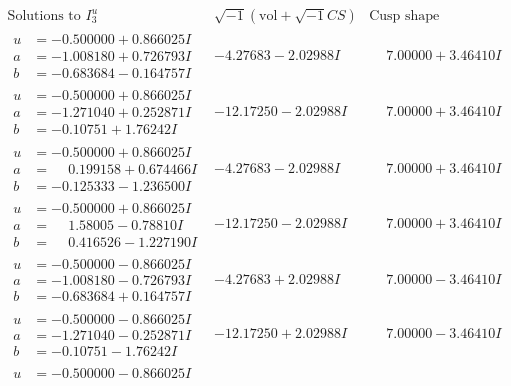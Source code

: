 \documentclass[1p]{elsarticle_modified}
\theoremstyle{definition}
\newcommand{\I}{\sqrt{-1}}
\begin{document}
$$\begin{array}{c|c|c}  
\text{Solutions to }I^u_{3}& \I (\text{vol} + \sqrt{-1}CS) & \text{Cusp shape}\\
 \hline 
\begin{aligned}
u &= -0.500000 + 0.866025 I \\
a &= -1.008180 + 0.726793 I \\
b &= -0.683684 - 0.164757 I\end{aligned}
 & -4.27683 - 2.02988 I & \phantom{-}7.00000 + 3.46410 I \\ \hline\begin{aligned}
u &= -0.500000 + 0.866025 I \\
a &= -1.271040 + 0.252871 I \\
b &= -0.10751 + 1.76242 I\end{aligned}
 & -12.17250 - 2.02988 I & \phantom{-}7.00000 + 3.46410 I \\ \hline\begin{aligned}
u &= -0.500000 + 0.866025 I \\
a &= \phantom{-}0.199158 + 0.674466 I \\
b &= -0.125333 - 1.236500 I\end{aligned}
 & -4.27683 - 2.02988 I & \phantom{-}7.00000 + 3.46410 I \\ \hline\begin{aligned}
u &= -0.500000 + 0.866025 I \\
a &= \phantom{-}1.58005 - 0.78810 I \\
b &= \phantom{-}0.416526 - 1.227190 I\end{aligned}
 & -12.17250 - 2.02988 I & \phantom{-}7.00000 + 3.46410 I \\ \hline\begin{aligned}
u &= -0.500000 - 0.866025 I \\
a &= -1.008180 - 0.726793 I \\
b &= -0.683684 + 0.164757 I\end{aligned}
 & -4.27683 + 2.02988 I & \phantom{-}7.00000 - 3.46410 I \\ \hline\begin{aligned}
u &= -0.500000 - 0.866025 I \\
a &= -1.271040 - 0.252871 I \\
b &= -0.10751 - 1.76242 I\end{aligned}
 & -12.17250 + 2.02988 I & \phantom{-}7.00000 - 3.46410 I \\ \hline\begin{aligned}
u &= -0.500000 - 0.866025 I \\

\end{aligned}
\end{array}$$
\end{document}
